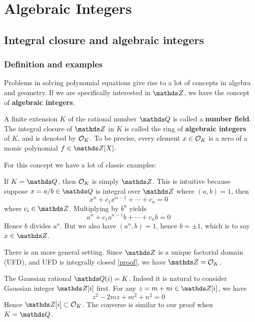 \chapter{Algebraic Integers}
	\section{Integral closure and algebraic integers}
		\subsection{Definition and examples}
			Problems in solving polynomial equations give rise to a lot of concepts in algebra and geometry. If we are specifically interested in $\mds{Z}$, we have the concept of \textbf{algebraic integers}.
			\begin{definition}
				A finite extension $K$ of the rational number $\mds{Q}$ is called a \textbf{number field}. The integral closure of $\mds{Z}$ in $K$ is called the ring of \textbf{algebraic integers} of $K$, and is denoted by $\mathcal{O}_K$. To be precise, every element $x \in \mathcal{O}_K$ is a zero of a monic polynomial $f \in \Z[X].$
			\end{definition}
			
			For this concept we have a lot of classic examples:
			
			\begin{example}
				If $K=\Q$, then $\mathcal{O}_K$ is simply $\Z$. This is intuitive because suppose $x=a/b \in \Q$ is integral over $\Z$ where $(a,b)=1$, then
				\[
				x^n+c_1x^{n-1}+\cdots+c_n = 0
				\]
				where $c_i \in \Z$. Multiplying by $b^n$ yields
				\[
				a^n+c_1a^{n-1}b+\cdots+c_nb = 0
				\]
				Hence $b$ divides $a^n$. But we also have $(a^n,b)=1$, hence $b=\pm 1$, which is to say $x \in \Z$.
				
				There is an more general setting. Since $\Z$ is a unique factorial domain (UFD), and UFD is integrally closed \href{https://proofwiki.org/wiki/Unique_Factorization_Domain_is_Integrally_Closed}{[proof]}, we have $\Z=\OK$. 
			\end{example}
			
			\begin{example}
				The Gaussian rational $\Q(i)=K$. Indeed it is natural to consider Gaussian integer $\Z[i]$ first. For any $z=m+ni \in \Z[i]$, we have
				\[
				z^2-2mz+m^2+n^2=0
				\]
				Hence $\Z[i] \subset \OK$. The converse is similar to our proof when $K=\Q$.
			\end{example}
			
